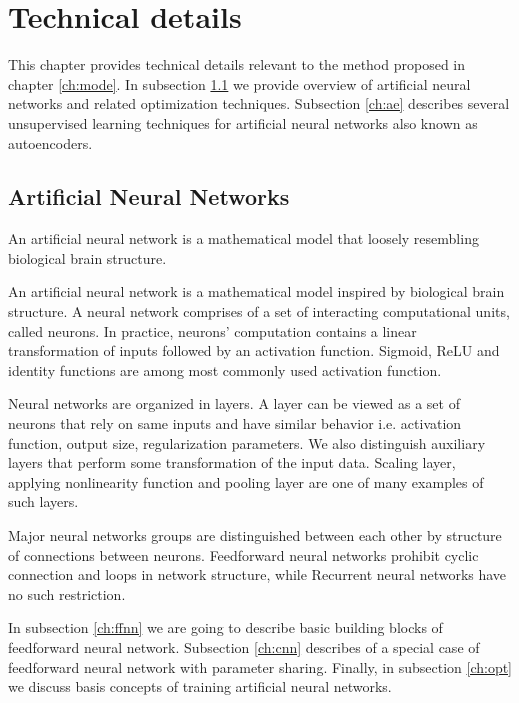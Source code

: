 
\chapter{Technical details}
\label{ch:tede}

This chapter provides technical details relevant to the method proposed in chapter \ref{ch:mode}.
In subsection \ref{ch:nn} we provide overview of artificial neural networks and related optimization techniques.
Subsection \ref{ch:ae} describes several unsupervised learning techniques for artificial neural networks also known as autoencoders.

\section{Artificial Neural Networks}
\label{ch:nn}
An artificial neural network is a mathematical model that loosely resembling biological brain structure.

An artificial neural network is a mathematical model inspired by biological brain structure.
A neural network comprises of a set of interacting computational units, called neurons.
In practice, neurons' computation contains a linear transformation of inputs followed by an activation function.
Sigmoid, ReLU and identity functions are among most commonly used activation function.

Neural networks are organized in layers.
A layer can be viewed as a set of neurons that rely on same inputs and have similar behavior i.e. activation function, output size, regularization parameters.
We also distinguish auxiliary layers that perform some transformation of the input data.
Scaling layer, applying nonlinearity function and pooling layer are one of many examples of such layers.

Major neural networks groups are distinguished between each other by structure of connections between neurons.
Feedforward neural networks prohibit cyclic connection and loops in network structure, while Recurrent neural networks have no such restriction.

In subsection \ref{ch:ffnn} we are going to describe basic building blocks of feedforward neural network.
Subsection \ref{ch:cnn} describes of a special case of feedforward neural network with parameter sharing.
Finally, in subsection \ref{ch:opt} we discuss basis concepts of training artificial neural networks.

